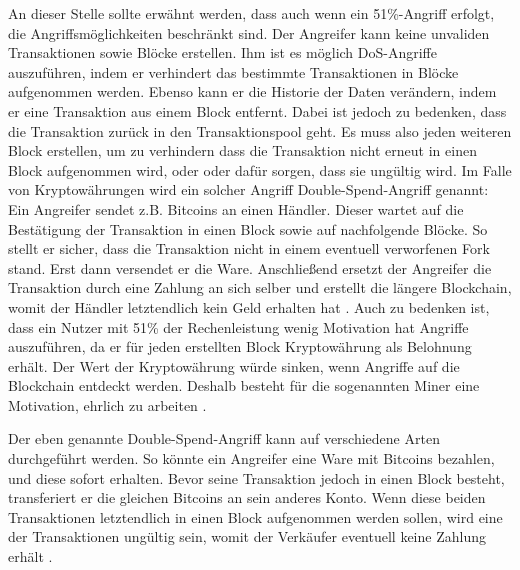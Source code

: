 An dieser Stelle sollte erwähnt werden, dass auch wenn ein 51\%-Angriff erfolgt, die Angriffsmöglichkeiten beschränkt sind. Der Angreifer kann keine unvaliden Transaktionen sowie Blöcke erstellen. Ihm ist es möglich DoS-Angriffe auszuführen, indem er verhindert das bestimmte Transaktionen in Blöcke aufgenommen werden. Ebenso kann er die Historie der Daten verändern, indem er eine Transaktion aus einem Block entfernt. Dabei ist jedoch zu bedenken, dass die Transaktion zurück in den Transaktionspool geht. Es muss also jeden weiteren Block erstellen, um zu verhindern dass die Transaktion nicht erneut in einen Block aufgenommen wird, oder oder dafür sorgen, dass sie ungültig wird. Im Falle von Kryptowährungen wird ein solcher Angriff Double-Spend-Angriff genannt: Ein Angreifer sendet z.B. Bitcoins an einen Händler. Dieser wartet auf die Bestätigung der Transaktion in einen Block sowie auf nachfolgende Blöcke. So stellt er sicher, dass die Transaktion nicht in einem eventuell verworfenen Fork stand. Erst dann versendet er die Ware. Anschließend ersetzt der Angreifer die Transaktion durch eine Zahlung an sich selber und erstellt die längere Blockchain, womit der Händler letztendlich kein Geld erhalten hat \cite{EthereumTeamEthereumWhitePaper2017}. Auch zu bedenken ist, dass ein Nutzer mit 51\% der Rechenleistung wenig Motivation hat Angriffe auszuführen, da er für jeden erstellten Block Kryptowährung als Belohnung erhält. Der Wert der Kryptowährung würde sinken, wenn Angriffe auf die Blockchain entdeckt werden. Deshalb besteht für die sogenannten Miner eine Motivation, ehrlich zu arbeiten \cite{AntonopoulosMasteringbitcoin2015}.

Der eben genannte Double-Spend-Angriff kann auf verschiedene Arten durchgeführt werden. So könnte ein Angreifer eine Ware mit Bitcoins bezahlen, und diese sofort erhalten. Bevor seine Transaktion jedoch in einen Block besteht, transferiert er die gleichen Bitcoins an sein anderes Konto. Wenn diese beiden Transaktionen letztendlich in einen Block aufgenommen werden sollen, wird eine der Transaktionen ungültig sein, womit der Verkäufer eventuell keine Zahlung erhält \cite{AntonopoulosMasteringbitcoin2015}.

